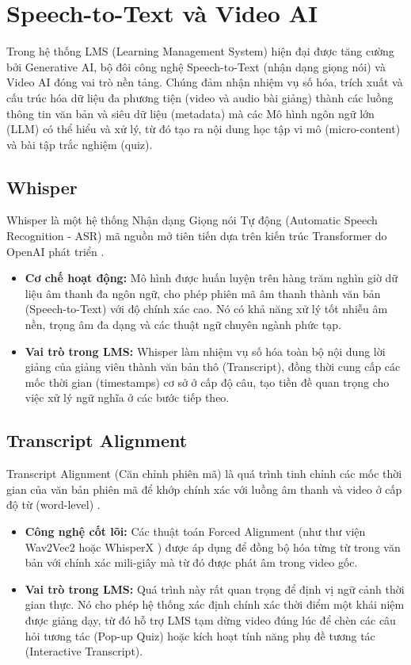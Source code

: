 \section{Speech-to-Text và Video AI}
Trong hệ thống LMS (Learning Management System) hiện đại được tăng cường bởi Generative AI, bộ đôi công nghệ Speech-to-Text (nhận dạng giọng nói) và Video AI đóng vai trò nền tảng. Chúng đảm nhận nhiệm vụ số hóa, trích xuất và cấu trúc hóa dữ liệu đa phương tiện (video và audio bài giảng) thành các luồng thông tin văn bản và siêu dữ liệu (metadata) mà các Mô hình ngôn ngữ lớn (LLM) có thể hiểu và xử lý, từ đó tạo ra nội dung học tập vi mô (micro-content) và bài tập trắc nghiệm (quiz).

\subsection{Whisper}
Whisper là một hệ thống Nhận dạng Giọng nói Tự động (Automatic Speech Recognition - ASR) mã nguồn mở tiên tiến dựa trên kiến trúc Transformer do OpenAI phát triển \cite{radford2023robust}.
\begin{itemize}
    \item \textbf{Cơ chế hoạt động:} Mô hình được huấn luyện trên hàng trăm nghìn giờ dữ liệu âm thanh đa ngôn ngữ, cho phép phiên mã âm thanh thành văn bản (Speech-to-Text) với độ chính xác cao. Nó có khả năng xử lý tốt nhiễu âm nền, trọng âm đa dạng và các thuật ngữ chuyên ngành phức tạp.
    \item \textbf{Vai trò trong LMS:} Whisper làm nhiệm vụ số hóa toàn bộ nội dung lời giảng của giảng viên thành văn bản thô (Transcript), đồng thời cung cấp các mốc thời gian (timestamps) cơ sở ở cấp độ câu, tạo tiền đề quan trọng cho việc xử lý ngữ nghĩa ở các bước tiếp theo.
\end{itemize}

\subsection{Transcript Alignment}
Transcript Alignment (Căn chỉnh phiên mã) là quá trình tinh chỉnh các mốc thời gian của văn bản phiên mã để khớp chính xác với luồng âm thanh và video ở cấp độ từ (word-level) \cite{mcauliffe2017montreal}.
\begin{itemize}
    \item \textbf{Công nghệ cốt lõi:} Các thuật toán Forced Alignment (như thư viện Wav2Vec2 \cite{baevski2020wav2vec} hoặc WhisperX \cite{bain2023whisperx}) được áp dụng để đồng bộ hóa từng từ trong văn bản với chính xác mili-giây mà từ đó được phát âm trong video gốc.
    \item \textbf{Vai trò trong LMS:} Quá trình này rất quan trọng để định vị ngữ cảnh thời gian thực. Nó cho phép hệ thống xác định chính xác thời điểm một khái niệm được giảng dạy, từ đó hỗ trợ LMS tạm dừng video đúng lúc để chèn các câu hỏi tương tác (Pop-up Quiz) hoặc kích hoạt tính năng phụ đề tương tác (Interactive Transcript).
\end{itemize}

